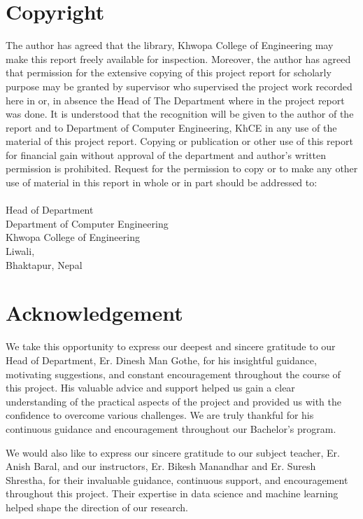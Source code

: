 		\large
			\chapter*{Copyright}
		\normalsize
			The author has agreed that the library, Khwopa College of Engineering  may make this report freely available for inspection. Moreover, the author has agreed that permission for the extensive copying of this project report for scholarly purpose may be granted by supervisor who supervised the project work recorded here in or, in absence the Head of The Department where in the project report was done. It is understood that the recognition will be given to the author of the report and to Department of Computer Engineering, KhCE in any use of the material of this project report. Copying or publication or other use of this report for financial gain without approval of the department and author's written permission is prohibited. Request for the permission to copy or to make any other use of material in this report in whole or in part should be addressed to: \\
			\vspace{1cm} \\
			Head of Department \\
			Department of Computer Engineering\\
			Khwopa College of Engineering\\
			Liwali,\\
			Bhaktapur, Nepal\\
		\break


		\large
			\chapter*{Acknowledgement}
		\normalsize
			We take this opportunity to express our deepest and sincere gratitude to our Head of Department, Er. Dinesh Man Gothe, for his insightful guidance, motivating suggestions, and constant encouragement throughout the course of this project. His valuable advice and support helped us gain a clear understanding of the practical aspects of the project and provided us with the confidence to overcome various challenges. We are truly thankful for his continuous guidance and encouragement throughout our Bachelor's program.

			We would also like to express our sincere gratitude to our subject teacher, Er. Anish Baral, and our instructors, Er. Bikesh Manandhar and Er. Suresh Shrestha, for their invaluable guidance, continuous support, and encouragement throughout this project. Their expertise in data science and machine learning helped shape the direction of our research.


